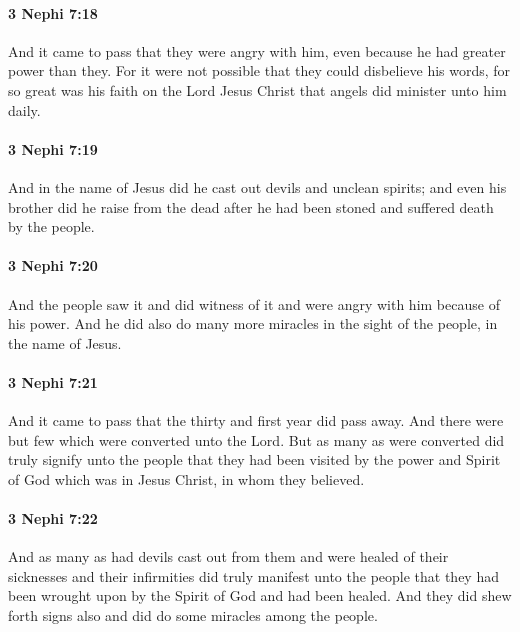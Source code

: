 		\paragraph{3 Nephi 7:18} %
			\label{3NEPHI-7-18}

			And it came to pass that they were angry with him,
			even because he had greater power than they.
			For it were not possible that they could disbelieve his words,
			for so great was his faith on the Lord Jesus Christ
			that angels did minister unto him daily.

		\paragraph{3 Nephi 7:19} %
			\label{3NEPHI-7-19}

			And in the name of Jesus did he cast out devils and unclean spirits;
			and even his brother did he raise from the dead
			after he had been stoned and suffered death by the people.

		\paragraph{3 Nephi 7:20} %
			\label{3NEPHI-7-20}

			And the people saw it and did witness of it
			and were angry with him because of his power.
			And he did also do many more miracles in the sight of the people,
			in the name of Jesus.

		\paragraph{3 Nephi 7:21} %
			\label{3NEPHI-7-21}

			And it came to pass that the thirty and first year did pass away.
			And there were but few which were converted unto the Lord.
			But as many as were converted did truly signify unto the people
			that they had been visited by the power and Spirit of God
			which was in Jesus Christ, in whom they believed.

		\paragraph{3 Nephi 7:22} %
			\label{3NEPHI-7-22}

			And as many as had devils cast out from them
			and were healed of their sicknesses and their infirmities
			did truly manifest unto the people
			that they had been wrought upon by the Spirit of God and had been healed.
			And they did shew forth signs also and did do some miracles among the people.

